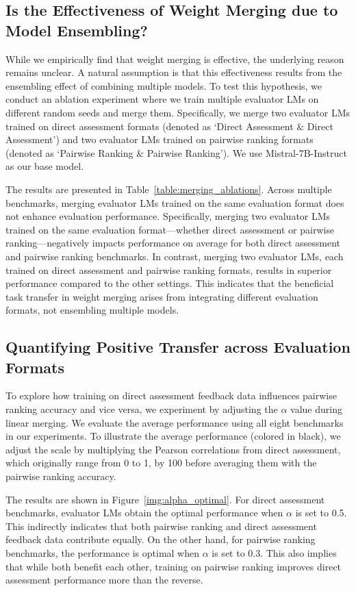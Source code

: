 \documentclass[11pt]{article}
\begin{document}
\subsection{Is the Effectiveness of Weight Merging due to Model Ensembling?}\label{sec:6.2}

While we empirically find that weight merging is effective, the underlying reason remains unclear. A natural assumption is that this effectiveness results from the ensembling effect of combining multiple models. To test this hypothesis, we conduct an ablation experiment where we train multiple evaluator LMs on different random seeds and merge them. Specifically, we merge two evaluator LMs trained on direct assessment formats (denoted as `Direct Assessment \& Direct Assessment') and two evaluator LMs trained on pairwise ranking formats (denoted as `Pairwise Ranking \& Pairwise Ranking'). We use Mistral-7B-Instruct as our base model.

The results are presented in Table~\ref{table:merging_ablations}. Across multiple benchmarks, merging evaluator LMs trained on the same evaluation format does not enhance evaluation performance. Specifically, merging two evaluator LMs trained on the same evaluation format—whether direct assessment or pairwise ranking—negatively impacts performance on average for both direct assessment and pairwise ranking benchmarks. In contrast, merging two evaluator LMs, each trained on direct assessment and pairwise ranking formats, results in superior performance compared to the other settings. This indicates that the beneficial task transfer in weight merging arises from integrating different evaluation formats, not ensembling multiple models.



\subsection{Quantifying Positive Transfer across Evaluation Formats}\label{sec:6.3}
To explore how training on direct assessment feedback data influences pairwise ranking accuracy and vice versa, we experiment by adjusting the $\alpha$ value during linear merging. We evaluate the average performance using all eight benchmarks in our experiments. To illustrate the average performance (colored in black), we adjust the scale by multiplying the Pearson correlations from direct assessment, which originally range from 0 to 1, by 100 before averaging them with the pairwise ranking accuracy.

The results are shown in Figure~\ref{img:alpha_optimal}. For direct assessment benchmarks, evaluator LMs obtain the optimal performance when $\alpha$ is set to 0.5. This indirectly indicates that both pairwise ranking and direct assessment feedback data contribute equally. On the other hand, for pairwise ranking benchmarks, the performance is optimal when $\alpha$ is set to 0.3. This also implies that while both benefit each other, training on pairwise ranking improves direct assessment performance more than the reverse.
\end{document}
